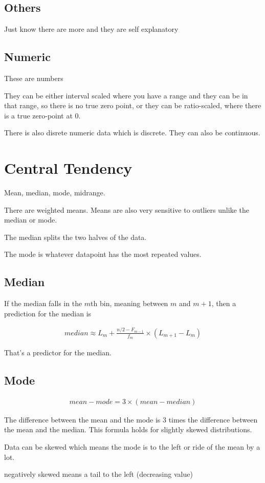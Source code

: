 \documentclass[fleqn]{report}
\newcommand{\equations} [1] {
\begin{gather*}
#1
\end{gather*}
}
\begin{document}
\subsection{Others}
Just know there are more and they are self explanatory

\subsection{Numeric}
These are numbers 

They can be either interval scaled where you have a range and they 
can be in that range, so there is no true zero point, 
or they can be ratio-scaled, where there is a true 
zero-point at 0.

There is also disrete numeric data which is discrete. They can 
also be continuous. 


\section{Central Tendency}
Mean, median, mode, midrange. 

There are weighted means. Means are also very sensitive to outliers unlike 
the median or mode. 

The median splits the two halves of the data. 

The mode is whatever datapoint has the most repeated values.

\subsection{Median}
If the median falls in the $m$th bin, meaning between $m$ and $m+1$, 
then a prediction for the median is 
\equations{
    median 
    \approx 
    L_m 
    +
    \frac{n/2 - F_{m-1}}{f_m} \times (L_{m + 1} - L_m)
}

That's a predictor for the median. 

\subsection{Mode}
\equations{
    mean - mode 
    =
    3 \times (mean - median)
}

The difference between the mean and the mode is 3 times the difference between 
the mean and the median. 
This formula holds for slightly skewed distributions. 

Data can be skewed which means the mode is to the left or ride of the mean by a lot.

negatively skewed means a tail to the left (decreasing value)
\end{document}
